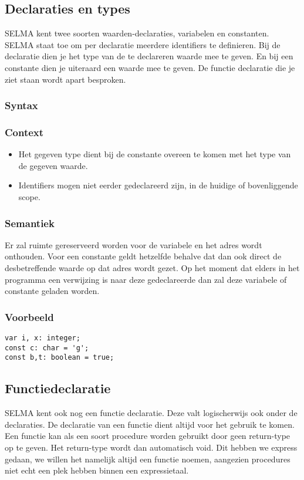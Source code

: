 \documentclass[]{article}
\begin{document}
\subsection{Declaraties en types}
SELMA kent twee soorten waarden-declaraties, variabelen en constanten. SELMA staat toe om per declaratie meerdere identifiers te definieren. Bij de declaratie dien je het type van de te declareren waarde mee te geven. En bij een constante dien je uiteraard een waarde mee te geven.
De functie declaratie die je ziet staan wordt apart besproken.
\subsubsection{Syntax}

\subsubsection{Context}
\begin{itemize}
\item Het gegeven type dient bij de constante overeen te komen met het type van de gegeven waarde.
\item Identifiers mogen niet eerder gedeclareerd zijn, in de huidige of bovenliggende scope.
\end{itemize}
\subsubsection{Semantiek}
Er zal ruimte gereserveerd worden voor de variabele en het adres wordt onthouden. Voor een constante geldt hetzelfde behalve dat dan ook direct de desbetreffende waarde op dat adres wordt gezet. Op het moment dat elders in het programma een verwijzing is naar deze gedeclareerde dan zal deze variabele of constante geladen worden.
\subsubsection{Voorbeeld}
\begin{lstlisting}[style=SELMA]
var i, x: integer;
const c: char = 'g';
const b,t: boolean = true;
\end{lstlisting}

\subsection{Functiedeclaratie}
SELMA kent ook nog een functie declaratie. Deze valt logischerwijs ook onder de declaraties. De declaratie van een functie dient altijd voor het gebruik te komen. Een functie kan als een soort procedure worden gebruikt door geen return-type op te geven. Het return-type wordt dan automatisch void. Dit hebben we express gedaan, we willen het namelijk altijd een functie noemen, aangezien procedures niet echt een plek hebben binnen een expressietaal.
\end{document}
